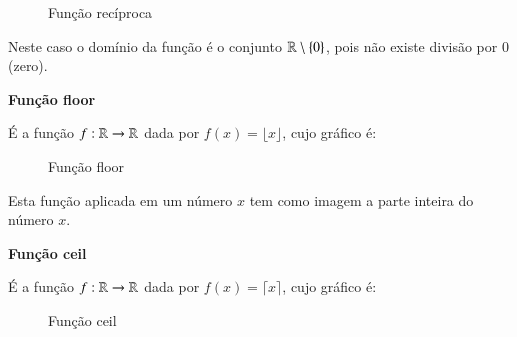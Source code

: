    \begin{figure}[H]
 \centering
    \caption{Função recíproca}
  \end{figure}
  
  Neste caso o domínio da função é o conjunto $\mathbb{R} \setminus \{0\}$, pois não existe divisão por $0$ (zero).
  
  \newpage

  \textbf{Função floor}
  
  É a função $f: \mathbb{R} \to \mathbb{R}$ dada por $f(x)= \lfloor {x} \rfloor$, cujo gráfico é:
  
   \begin{figure}[H]
 \centering
    \caption{Função floor}
  \end{figure}
  
  Esta função aplicada em um número $x$ tem como imagem a parte inteira do número $x$.
  
  \textbf{Função ceil}
  
  É a função $f: \mathbb{R} \to \mathbb{R}$ dada por $f(x)= \lceil {x} \rceil$, cujo gráfico é:
  
   \begin{figure}[H]
 \centering
    \caption{Função ceil}
  \end{figure}
  
